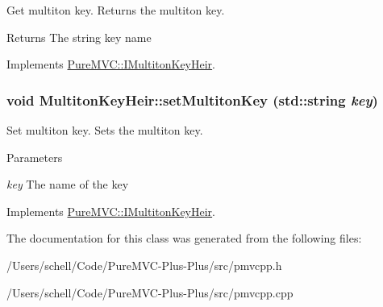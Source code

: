 Get multiton key. Returns the multiton key. \begin{DoxyReturn}{Returns}
The string key name 
\end{DoxyReturn}


Implements \hyperlink{class_pure_m_v_c_1_1_i_multiton_key_heir_aecccfb9898368c6377550ceae5730934}{PureMVC::IMultitonKeyHeir}.\hypertarget{class_pure_m_v_c_1_1_multiton_key_heir_abc70ef7c066bc8d7bf0196ec727599bb}{
\subsubsection[{setMultitonKey}]{\setlength{\rightskip}{0pt plus 5cm}void MultitonKeyHeir::setMultitonKey (std::string {\em key})}}
\label{class_pure_m_v_c_1_1_multiton_key_heir_abc70ef7c066bc8d7bf0196ec727599bb}


Set multiton key. Sets the multiton key. 
\begin{DoxyParams}{Parameters}
\item[{\em key}]The name of the key \end{DoxyParams}


Implements \hyperlink{class_pure_m_v_c_1_1_i_multiton_key_heir_a03acb75ab79defba2c28b8de1bbe1ca6}{PureMVC::IMultitonKeyHeir}.

The documentation for this class was generated from the following files:\begin{DoxyCompactItemize}
\item 
/Users/schell/Code/PureMVC-\/Plus-\/Plus/src/pmvcpp.h\item 
/Users/schell/Code/PureMVC-\/Plus-\/Plus/src/pmvcpp.cpp\end{DoxyCompactItemize}
